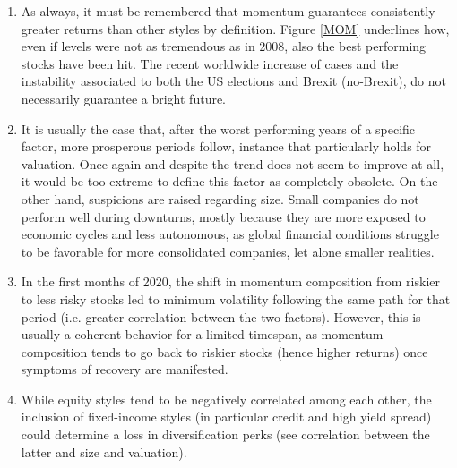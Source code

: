 \documentclass[12pt]{article}
\begin{document}
\begin{enumerate}
\item As always, it must be remembered that momentum guarantees consistently greater returns than other styles by definition. Figure \ref{MOM} underlines how, even if levels were not as tremendous as in 2008, also the best performing stocks have been hit. The recent worldwide increase of cases and the instability associated to both the US elections and Brexit (no-Brexit), do not necessarily guarantee a bright future.
\item It is usually the case that, after the worst performing years of a specific factor, more prosperous periods follow, instance that particularly holds for valuation. Once again and despite the trend does not seem to improve at all, it would be too extreme to define this factor as completely obsolete. On the other hand, suspicions are raised regarding size. Small companies do not perform well during downturns, mostly because they are more exposed to economic cycles and less autonomous, as global financial conditions struggle to be favorable for more consolidated companies, let alone smaller realities.
\item In the first months of 2020, the shift in momentum composition from riskier to less risky stocks led to minimum volatility following the same path for that period (i.e. greater correlation between the two factors). However, this is usually a coherent behavior for a limited timespan, as momentum composition tends to go back to riskier stocks (hence higher returns) once symptoms of recovery are manifested.
\item While equity styles tend to be negatively correlated among each other, the inclusion of fixed-income styles (in particular credit and high yield spread) could determine a loss in diversification perks (see correlation between the latter and size and valuation).  
\end{enumerate}
\end{document}

